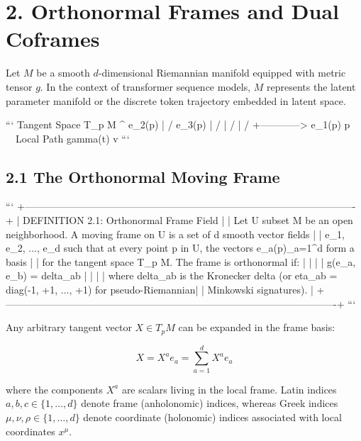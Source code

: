 \documentclass[11pt,twoside,openright]{amsbook}
\begin{document}
{{{{{{\section{2. Orthonormal Frames and Dual Coframes}

Let $M$ be a smooth $d$-dimensional Riemannian manifold equipped with metric tensor $g$. In the context of transformer sequence models, $M$ represents the latent parameter manifold or the discrete token trajectory embedded in latent space.

```
                  Tangent Space T_p M
                  ^ e_2(p)
                  |    / e_3(p)
                  |   /
                  |  /
                  | /
                  +------------> e_1(p)
                 p \
                    \  Local Path gamma(t)
                     v
```

\subsection{2.1 The Orthonormal Moving Frame}

```
+----------------------------------------------------------------------------------------------------+
| DEFINITION 2.1: Orthonormal Frame Field                                                            |
| Let U subset M be an open neighborhood. A moving frame on U is a set of d smooth vector fields     |
| {e_1, e_2, ..., e_d} such that at every point p in U, the vectors {e_a(p)}_{a=1}^d form a basis    |
| for the tangent space T_p M. The frame is orthonormal if:                                          |
|                                                                                                    |
|   g(e_a, e_b) = delta_{ab}                                                                         |
|                                                                                                    |
| where delta_{ab} is the Kronecker delta (or eta_{ab} = diag(-1, +1, ..., +1) for pseudo-Riemannian|
| Minkowski signatures).                                                                             |
+----------------------------------------------------------------------------------------------------+
```

Any arbitrary tangent vector $X \in T_p M$ can be expanded in the frame basis:

$$X = X^a e_a = \sum_{a=1}^d X^a e_a$$

where the components $X^a$ are scalars living in the local frame. Latin indices $a, b, c \in \{1, \dots, d\}$ denote frame (anholonomic) indices, whereas Greek indices $\mu, \nu, \rho \in \{1, \dots, d\}$ denote coordinate (holonomic) indices associated with local coordinates $x^\mu$.

}}}}}}
\end{document}
